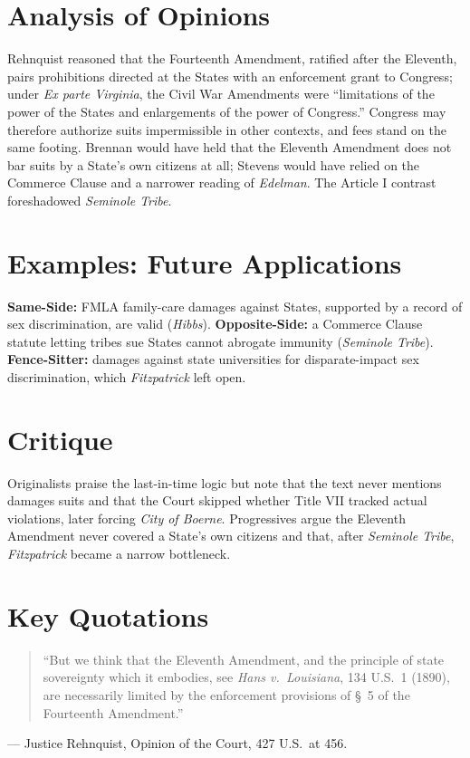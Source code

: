 \documentclass[12pt]{article}
\begin{document}
\section{Analysis of Opinions}
Rehnquist reasoned that the Fourteenth Amendment, ratified after the Eleventh, pairs prohibitions directed at the States with an enforcement grant to Congress; under \textit{Ex parte Virginia}, the Civil War Amendments were ``limitations of the power of the States and enlargements of the power of Congress.'' Congress may therefore authorize suits impermissible in other contexts, and fees stand on the same footing. Brennan would have held that the Eleventh Amendment does not bar suits by a State's own citizens at all; Stevens would have relied on the Commerce Clause and a narrower reading of \textit{Edelman}. The Article I contrast foreshadowed \textit{Seminole Tribe}.

\section{Examples: Future Applications}
\textbf{Same-Side:} FMLA family-care damages against States, supported by a record of sex discrimination, are valid (\textit{Hibbs}). \textbf{Opposite-Side:} a Commerce Clause statute letting tribes sue States cannot abrogate immunity (\textit{Seminole Tribe}). \textbf{Fence-Sitter:} damages against state universities for disparate-impact sex discrimination, which \textit{Fitzpatrick} left open.

\section{Critique}
Originalists praise the last-in-time logic but note that the text never mentions damages suits and that the Court skipped whether Title VII tracked actual violations, later forcing \textit{City of Boerne}. Progressives argue the Eleventh Amendment never covered a State's own citizens and that, after \textit{Seminole Tribe}, \textit{Fitzpatrick} became a narrow bottleneck.

\section{Key Quotations}
\begin{quote}\sloppy
``But we think that the Eleventh Amendment, and the principle of state sovereignty which it embodies, see \textit{Hans v.\ Louisiana}, 134 U.S.\ 1 (1890), are necessarily limited by the enforcement provisions of \S~5 of the Fourteenth Amendment.''
\end{quote}
\noindent --- Justice Rehnquist, Opinion of the Court, 427 U.S.\ at 456.
\end{document}

